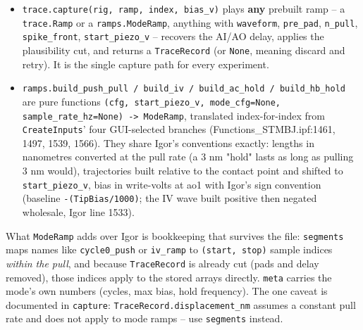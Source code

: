 \begin{itemize}[leftmargin=*]
\item \texttt{trace.\discretionary{}{}{}capture(rig,\discretionary{}{}{} ramp,\discretionary{}{}{} index,\discretionary{}{}{} bias\_\discretionary{}{}{}v)} plays \textbf{any} prebuilt ramp -- a \texttt{trace.\discretionary{}{}{}Ramp} or a \texttt{ramps.\discretionary{}{}{}Mode\discretionary{}{}{}Ramp}, anything with \texttt{waveform}, \texttt{pre\_\discretionary{}{}{}pad}, \texttt{n\_\discretionary{}{}{}pull}, \texttt{spike\_\discretionary{}{}{}front}, \texttt{start\_\discretionary{}{}{}piezo\_\discretionary{}{}{}v} -- recovers the AI/AO delay, applies the plausibility cut, and returns a \texttt{Trace\discretionary{}{}{}Record} (or \texttt{None}, meaning discard and retry). It is the single capture path for every experiment.
\item \texttt{ramps.\discretionary{}{}{}build\_\discretionary{}{}{}push\_\discretionary{}{}{}pull /\discretionary{}{}{} build\_\discretionary{}{}{}iv /\discretionary{}{}{} build\_\discretionary{}{}{}ac\_\discretionary{}{}{}hold /\discretionary{}{}{} build\_\discretionary{}{}{}hb\_\discretionary{}{}{}hold} are pure functions \texttt{(cfg,\discretionary{}{}{} start\_\discretionary{}{}{}piezo\_\discretionary{}{}{}v,\discretionary{}{}{} mode\_\discretionary{}{}{}cfg=None,\discretionary{}{}{} sample\_\discretionary{}{}{}rate\_\discretionary{}{}{}hz=None) -> Mode\discretionary{}{}{}Ramp}, translated index-for-index from \texttt{Create\discretionary{}{}{}Inputs}' four GUI-selected branches (Functions\_STMBJ.ipf:1461, 1497, 1539, 1566). They share Igor's conventions exactly: lengths in nanometres converted at the pull rate (a 3 nm "hold" lasts as long as pulling 3 nm would), trajectories built relative to the contact point and shifted to \texttt{start\_\discretionary{}{}{}piezo\_\discretionary{}{}{}v}, bias in write-volts at ao1 with Igor's sign convention (baseline \texttt{-(Tip\discretionary{}{}{}Bias/\discretionary{}{}{}1000)}; the IV wave built positive then negated wholesale, Igor line 1533).
\end{itemize}

What \texttt{Mode\discretionary{}{}{}Ramp} adds over Igor is bookkeeping that survives the file: \texttt{segments} maps names like \texttt{cycle0\_\discretionary{}{}{}push} or \texttt{iv\_\discretionary{}{}{}ramp} to \texttt{(start,\discretionary{}{}{} stop)} sample indices \emph{within the pull}, and because \texttt{Trace\discretionary{}{}{}Record} is already cut (pads and delay removed), those indices apply to the stored arrays directly. \texttt{meta} carries the mode's own numbers (cycles, max bias, hold frequency). The one caveat is documented in \texttt{capture}: \texttt{Trace\discretionary{}{}{}Record.\discretionary{}{}{}displacement\_\discretionary{}{}{}nm} assumes a constant pull rate and does not apply to mode ramps -- use \texttt{segments} instead.

